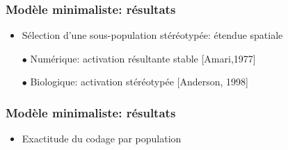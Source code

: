 \documentclass[10pt]{beamer}
\begin{document}
\begin{frame}
  \frametitle{Mod\`ele minimaliste: r\'esultats}
\begin{itemize}
\item S\'election d'{\color {blue}une} sous-population {\color {blue}st\'er\'eotyp\'ee}: \'etendue spatiale
\end{itemize}
\begin{center}
\end{center}
\begin{itemize}
\item[$\bullet$]Num\'erique: activation r\'esultante stable [Amari,1977]
\item[$\bullet$]Biologique: activation st\'er\'eotyp\'ee [Anderson, 1998]
\end{itemize}

\end{frame}
\begin{frame}
  \frametitle{Mod\`ele minimaliste: r\'esultats}
\begin{itemize}
\item {\color{myblue}Exactitude du codage par population}
\end{itemize}

\hspace{2cm}
\end{frame}
\end{document}
